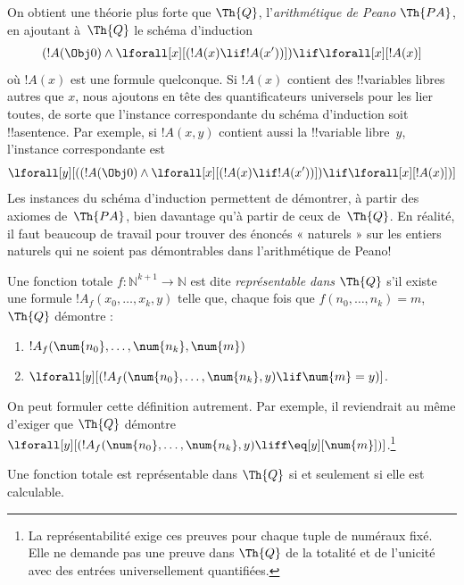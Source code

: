 \documentclass[../../../include/open-logic-section]{subfiles}
\begin{document}
On obtient une théorie plus forte que $\Th{Q}$,
l'\emph{arithmétique de Peano} $\Th{PA}$, en ajoutant à~$\Th{Q}$
le schéma d'induction
\[
(!A(\Obj 0) \land \lforall[x][(!A(x) \lif !A(x'))]) \lif \lforall[x][!A(x)]
\]
où $!A(x)$ est une formule quelconque. Si $!A(x)$ contient des
!!{variable}s libres autres que $x$, nous ajoutons en tête des
quantificateurs universels pour les lier toutes, de sorte que
l'instance correspondante du schéma d'induction soit !!a{sentence}.
Par exemple, si $!A(x,y)$ contient aussi la !!{variable} libre~$y$,
l'instance correspondante est
\[
\lforall[y][((!A(\Obj 0) \land \lforall[x][(!A(x) \lif !A(x'))]) \lif
  \lforall[x][!A(x)])]
\]
Les instances du schéma d'induction permettent de démontrer,
à partir des axiomes de~$\Th{PA}$, bien davantage qu'à partir
de ceux de~$\Th{Q}$. En réalité, il faut beaucoup de travail
pour trouver des énoncés « naturels » sur les entiers naturels
qui ne soient pas démontrables dans l'arithmétique de Peano!{}

\begin{defn}
  Une fonction totale $f\colon\mathbb{N}^{k+1}\to\mathbb{N}$ est dite
  {\em représentable dans $\Th{Q}$}
  s'il existe une formule $!A_f(x_0,\dots,x_k,y)$ telle que, chaque
  fois que $f(n_0,\dots,n_k) = m$, $\Th{Q}$ démontre :
\begin{enumerate}
\item{} $!A_f(\num{n_0}, \dots, \num{n_k}, \num{m})$
\item{} $\lforall[y][(!A_f(\num{n_0}, \dots,
\num{n_k}, y) \lif \num{m} = y)]$.
\end{enumerate}
\end{defn}

On peut formuler cette définition autrement. Par exemple, il
reviendrait au même d'exiger que $\Th{Q}$ démontre
$\lforall[y][(!A_f(\num{n_0}, \dots,
\num{n_k}, y) \liff \eq[y][\num{m}])]$.\footnote{La représentabilité exige ces preuves pour chaque tuple de numéraux fixé. Elle ne demande pas une preuve dans $\Th{Q}$ de la totalité et de l'unicité avec des entrées universellement quantifiées.}

\begin{thm}
Une fonction totale est représentable dans $\Th{Q}$ si et seulement si
elle est calculable.
\end{thm}
\end{document}
